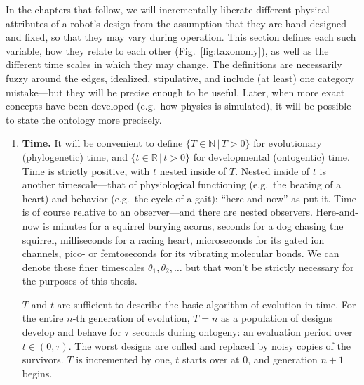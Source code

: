 \noindent
In the chapters that follow, we will incrementally liberate different physical attributes of a robot's design from the assumption that they are hand designed and fixed, so that they may vary during operation.
This section 
defines each such variable, 
how they relate to each other (Fig.~\ref{fig:taxonomy}), 
as well as the different time scales in which they may change.
The definitions are necessarily fuzzy around the edges, idealized, stipulative, and include (at least) one category mistake---but they will be precise enough to be useful.
Later, when more exact concepts have been developed (e.g.~how physics is simulated), it will be possible to state the ontology more precisely.%


\begin{enumerate}

    \item \textbf{Time.} It will be convenient to define $\{T\in\mathbb{N} \,|\, T>0\}$ for evolutionary (phylogenetic) time, and $\{t\in\mathbb{R} \,|\, t>0\}$ for developmental (ontogentic) time.
    Time is strictly positive, with $t$ nested inside of $T$.
    Nested inside of $t$ is another timescale---that of physiological functioning (e.g.~the beating of a heart) and behavior (e.g.~the cycle of a gait):
    ``here and now'' as \citet{pfeifer2006body} put it.
    Time is of course relative to an observer---and there are nested observers.
    Here-and-now is minutes for a squirrel burying acorns, seconds for a dog chasing the squirrel, milliseconds for a racing heart, microseconds for its gated ion channels, pico- or femtoseconds for its vibrating molecular bonds.
    We can denote these finer timescales $\theta_1, \theta_2, \ldots$
    but that won't be strictly necessary for the purposes of this thesis.
    
    $T$ and $t$ are sufficient to describe the basic algorithm of evolution in time.
    For the entire $n$-th generation of evolution, $T=n$ as a population of designs develop and behave for $\tau$ seconds during ontogeny: an evaluation period over $t\in(0, \tau)$.
    The worst designs are culled and replaced by noisy copies of the survivors.
    $T$ is incremented by one, $t$ starts over at 0, and generation $n+1$ begins.
    
    

\end{enumerate}
